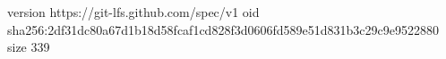 version https://git-lfs.github.com/spec/v1
oid sha256:2df31dc80a67d1b18d58fcaf1cd828f3d0606fd589e51d831b3c29c9e9522880
size 339
